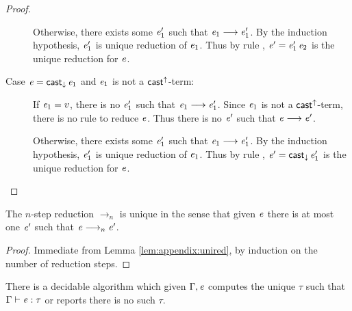 \begin{proof}
\begin{description}
		Otherwise, there exists some $\mathit{e'_{{\mathrm{1}}}}$ such that $\mathit{e_{{\mathrm{1}}}}  \longrightarrow  \mathit{e'_{{\mathrm{1}}}}$. By the induction hypothesis, $\mathit{e'_{{\mathrm{1}}}}$ is unique reduction of $\mathit{e_{{\mathrm{1}}}}$. Thus by rule , $\mathit{e}'=\mathit{e'_{{\mathrm{1}}}} \, \mathit{e_{{\mathrm{2}}}}$ is the unique reduction for $\mathit{e}$.
		\item[Case $\mathit{e}=\mathsf{cast}_{\downarrow} \, \mathit{e_{{\mathrm{1}}}}$ and $\mathit{e_{{\mathrm{1}}}}$ is not a $ \mathsf{cast}^{\uparrow} $-term:] If $\mathit{e_{{\mathrm{1}}}}=v$, there is no $\mathit{e'_{{\mathrm{1}}}}$ such that $\mathit{e_{{\mathrm{1}}}}  \longrightarrow  \mathit{e'_{{\mathrm{1}}}}$. Since $\mathit{e_{{\mathrm{1}}}}$ is not a $ \mathsf{cast}^{\uparrow} $-term, there is no rule to reduce $\mathit{e}$. Thus there is no $\mathit{e}'$ such that $\mathit{e}  \longrightarrow  \mathit{e'}$.
		
		Otherwise, there exists some $\mathit{e'_{{\mathrm{1}}}}$ such that $\mathit{e_{{\mathrm{1}}}}  \longrightarrow  \mathit{e'_{{\mathrm{1}}}}$. By the induction hypothesis, $\mathit{e'_{{\mathrm{1}}}}$ is unique reduction of $\mathit{e_{{\mathrm{1}}}}$. Thus by rule , $\mathit{e}'=\mathsf{cast}_{\downarrow} \, \mathit{e'_{{\mathrm{1}}}}$ is the unique reduction for $\mathit{e}$.
	\end{description}
\end{proof}

\begin{lem}\label{lem:appendix:uniquen}
	The $n$-step reduction $ \longrightarrow_n $ is unique in the sense that given $\mathit{e}$ there is at most one $\mathit{e'}$ such that $\mathit{e}  \longrightarrow_n  \mathit{e'}$.
\end{lem}

\begin{proof}
	Immediate from Lemma \ref{lem:appendix:unired}, by induction on the number of reduction steps.
\end{proof}

\begin{lem}
	There is a decidable algorithm which given $\Gamma, \mathit{e}$ computes the unique $\tau$ such that $\Gamma  \vdash  \mathit{e}  :  \tau$ or reports there is no such $\tau$.
\end{lem}


